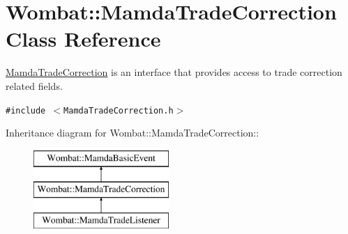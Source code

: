 \hypertarget{classWombat_1_1MamdaTradeCorrection}{
\section{Wombat::Mamda\-Trade\-Correction Class Reference}
\label{classWombat_1_1MamdaTradeCorrection}
}
\hyperlink{classWombat_1_1MamdaTradeCorrection}{Mamda\-Trade\-Correction} is an interface that provides access to trade correction related fields.  


{\tt \#include $<$Mamda\-Trade\-Correction.h$>$}

Inheritance diagram for Wombat::Mamda\-Trade\-Correction::\begin{figure}[H]
\begin{center}
\leavevmode
\includegraphics[height=3cm]{classWombat_1_1MamdaTradeCorrection}
\end{center}
\end{figure}

